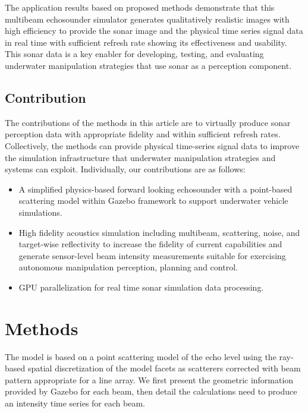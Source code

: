 \documentclass[utf8]{frontiersSCNS} %
\begin{document}
The application results based on proposed methods demonstrate that this multibeam echosounder simulator generates qualitatively realistic images with high efficiency to provide the sonar image and the physical time series signal data in real time with sufficient refresh rate showing its effectiveness and usability. This sonar data is a key enabler for developing, testing, and evaluating underwater manipulation strategies that use sonar as a perception component.

\subsection{Contribution}
The contributions of the methods in this article are to virtually produce sonar perception data with appropriate fidelity and within sufficient refresh rates. Collectively, the methods can provide physical time-series signal data to improve the simulation infrastructure that underwater manipulation strategies and systems can exploit. Individually, our contributions are as follows: 
\begin{itemize}
\item A simplified physics-based forward looking echosounder with a point-based scattering model within Gazebo framework to support underwater vehicle simulations.
\item High fidelity acoustics simulation including multibeam, scattering, noise, and target-wise reflectivity to increase the fidelity of current capabilities and generate sensor-level beam intensity measurements suitable for exercising autonomous manipulation perception, planning and control.
\item GPU parallelization for real time sonar simulation data processing.
\end{itemize}


\section{Methods}

The model is based on a point scattering model of the echo level using the ray-based spatial discretization of the model facets as scatterers corrected with beam pattern appropriate for a line array. We first present the geometric information provided by Gazebo for each beam, then detail the calculations need to produce an intensity time series for each beam.
\end{document}
